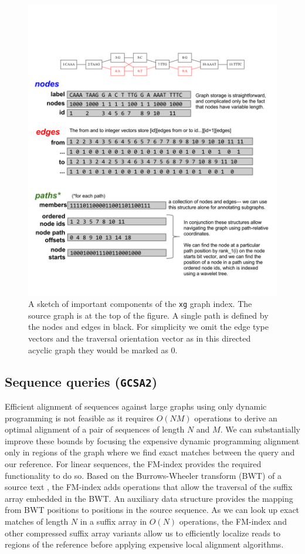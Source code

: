 \documentclass[12pt]{article}
\begin{document}
\begin{figure}[t]
\centering
\includegraphics[width=1.0\textwidth]{figures/xg}
\caption{\label{fig:xg}
  A sketch of important components of the {\tt xg} graph index.
  The source graph is at the top of the figure.
  A single path is defined by the nodes and edges in black.
  For simplicity we omit the edge type vectors and the traversal orientation vector as in this directed acyclic graph they would be marked as 0.
}
\end{figure}


\subsection{Sequence queries ({\tt GCSA2})}

Efficient alignment of sequences against large graphs using only dynamic programming is not feasible as it requires $O(NM)$ operations to derive an optimal alignment of a pair of sequences of length $N$ and $M$.
We can substantially improve these bounds by focusing the expensive dynamic programming alignment only in regions of the graph where we find exact matches between the query and our reference.
For linear sequences, the FM-index \cite{fmindex2000, fmindex2005} provides the required functionality to do so.
Based on the Burrows-Wheeler transform (BWT) of a source text \cite{burrowswheeler1994}, the FM-index adds operations that allow the traversal of the suffix array embedded in the BWT.
An auxiliary data structure provides the mapping from BWT positions to positions in the source sequence.
As we can look up exact matches of length $N$ in a suffix array in $O(N)$ operations, the FM-index and other compressed suffix array variants allow us to efficiently localize reads to regions of the reference before applying expensive local alignment algorithms.
\end{document}
